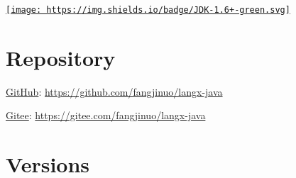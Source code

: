\documentclass[
]{book}
\begin{document}
\href{https://www.oracle.com/technetwork/java/javase/downloads/index.html}{\texttt{[image: https://img.shields.io/badge/JDK-1.6+-green.svg]}}

\hypertarget{repository}{%
\section{Repository}\label{repository}}

\href{https://github.com/fangjinuo/langx-java}{GitHub}: \url{https://github.com/fangjinuo/langx-java}

\href{https://gitee.com/fangjinuo/langx-java}{Gitee}: \url{https://gitee.com/fangjinuo/langx-java}

\hypertarget{langx-java_version}{%
\section{Versions}\label{langx-java_version}}
\end{document}
